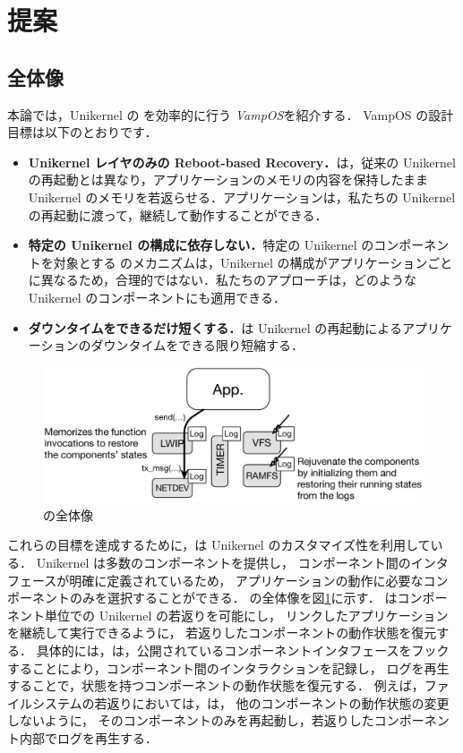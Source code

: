 \section{提案} \label{section:proposal}

\subsection{全体像}

本論では，Unikernel の \rr を効率的に行う \emph{VampOS}を紹介する．
VampOS の設計目標は以下のとおりです．

\begin{itemize}
    \item \textbf{Unikernel レイヤのみの Reboot-based Recovery．}{\sysname は，従来の Unikernel の再起動とは異なり，アプリケーションのメモリの内容を保持したまま Unikernel のメモリを若返らせる．アプリケーションは，私たちの Unikernel の再起動に渡って，継続して動作することができる．}
    \item \textbf{特定の Unikernel の構成に依存しない．}{特定の Unikernel のコンポーネントを対象とする \rr のメカニズムは，Unikernel の構成がアプリケーションごとに異なるため，合理的ではない．私たちのアプローチは，どのような Unikernel のコンポーネントにも適用できる．}
    \item \textbf{ダウンタイムをできるだけ短くする．}{\sysname は Unikernel の再起動によるアプリケーションのダウンタイムをできる限り短縮する．}
\end{itemize}

\begin{figure}[t]
    \begin{center}
      \includegraphics[scale=0.3]{./img/vampos.eps}
      \caption{{\sysname} の全体像} 
      \label{fig:overview}
    \end{center}
\end{figure}

これらの目標を達成するために，\sysname は Unikernel のカスタマイズ性を利用している．
Unikernel は多数のコンポーネントを提供し，
コンポーネント間のインタフェースが明確に定義されているため，
アプリケーションの動作に必要なコンポーネントのみを選択することができる．
\sysname の全体像を図\ref{fig:overview}に示す．
\sysname はコンポーネント単位での Unikernel の若返りを可能にし，
リンクしたアプリケーションを継続して実行できるように，
若返りしたコンポーネントの動作状態を復元する．
具体的には，\sysname は，公開されているコンポーネントインタフェースをフックすることにより，コンポーネント間のインタラクションを記録し，
ログを再生することで，状態を持つコンポーネントの動作状態を復元する．
例えば，ファイルシステムの若返りにおいては，\sysname は，
他のコンポーネントの動作状態の変更しないように，
そのコンポーネントのみを再起動し，若返りしたコンポーネント内部でログを再生する．

